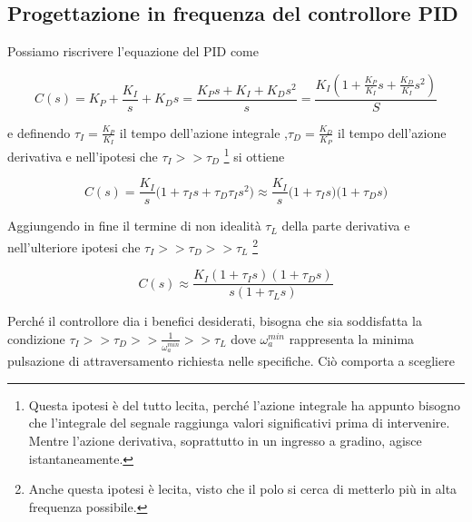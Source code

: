 	
	
	
	
	
	
	
	
	
	
	
	
	
	
	
	
	
	\subsection{Progettazione in frequenza del controllore PID}
	\label{sub:ProgettazionePID}
	
		Possiamo riscrivere l'equazione del PID come
		
		\begin{equation}
			C(s)=K_P + \frac{K_I}{s} + K_Ds=\frac{K_Ps+K_I+K_Ds^2}{s}=\frac{K_I(1+\frac{K_P}{K_I}s+\frac{K_D}{K_I}s^2)}{S}
			\label{eq:PIDriscritto}
		\end{equation}
		
		\noindent e definendo $\tau_I=\frac{K_P}{K_I}$ il tempo dell'azione integrale ,$\tau_D=\frac{K_D}{K_P}$ il tempo dell'azione derivativa e nell'ipotesi che $\tau_I>>\tau_D$ \footnote{Questa ipotesi è del tutto lecita, perché l'azione integrale ha appunto bisogno che l'integrale del segnale raggiunga valori significativi prima di intervenire. Mentre l'azione derivativa, soprattutto in un ingresso a gradino, agisce istantaneamente.} si ottiene 
		
		\begin{equation}
			C(s)=\frac{K_I}{s}\bigl(1+\tau_Is+\tau_D\tau_Is^2\bigl) \approx \frac{K_I}{s}\bigl(1+\tau_Is\bigl)\bigl(1+\tau_Ds\bigl)
			\label{eq:PIDtau}
		\end{equation}
		
		\noindent Aggiungendo in fine il termine di non idealità $\tau_L$ della parte derivativa e nell'ulteriore ipotesi che $\tau_I>>\tau_D>>\tau_L$ \footnote{Anche questa ipotesi è lecita, visto che il polo si cerca di metterlo più in alta frequenza possibile.}
		
		\begin{equation}
			C(s) \approx \frac{K_I(1+\tau_Is)(1+\tau_Ds)}{s(1+\tau_Ls)}
			\label{eq:PIDfinale}
		\end{equation}
	
		\noindent Perché il controllore dia i benefici desiderati, bisogna che sia soddisfatta la condizione $\tau_I>>\tau_D>>\frac{1}{\omega_a^{min}}>>\tau_L$ dove $\omega_a^{min}$ rappresenta la minima pulsazione di attraversamento richiesta nelle specifiche. Ciò comporta a scegliere
		
